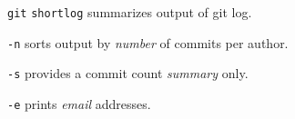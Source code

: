 %

\begin{compactenum}
\item [\texttt{git}] \texttt{shortlog} summarizes output of git log.
\item [\texttt{-n}] sorts output by \emph{number} of commits per author.
\item [\texttt{-s}] provides a commit count \emph{summary} only.
\item [\texttt{-e}] prints \emph{email} addresses.
\end{compactenum}

%